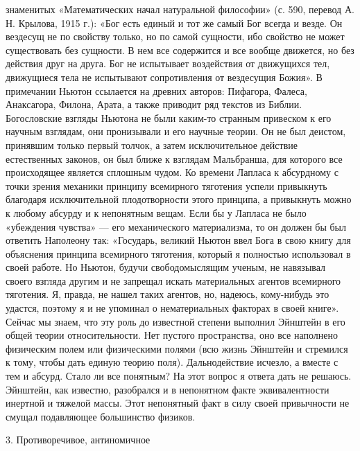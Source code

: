 знаменитых «Математических начал натуральной философии» (с. 590, перевод А. Н.
Крылова, 1915 г.): «Бог есть единый и тот же самый Бог всегда и везде. Он
вездесущ не по свойству только, но по самой сущности, ибо свойство не может
существовать без сущности. В нем все содержится и все вообще движется, но без
действия друг на друга. Бог не испытывает воздействия от движущихся тел,
движущиеся тела не испытывают сопротивления от вездесущия Божия». В примечании
Ньютон ссылается на древних авторов: Пифагора, Фалеса, Анаксагора, Филона,
Арата, а также приводит ряд текстов из Библии. Богословские взгляды Ньютона не
были каким-то странным привеском к его научным взглядам, они пронизывали и его
научные теории. Он не был деистом, принявшим только первый толчок, а затем
исключительное действие естественных законов, он был ближе к взглядам
Мальбранша, для которого все происходящее является сплошным чудом. Ко времени
Лапласа к абсурдному с точки зрения механики принципу всемирного тяготения
успели привыкнуть благодаря исключительной плодотворности этого принципа, а
привыкнуть можно к любому абсурду и к непонятным вещам. Если бы у Лапласа не
было «убеждения чувства» --- его механического материализма, то он должен бы
был ответить Наполеону так: «Государь, великий Ньютон ввел Бога в свою книгу
для объяснения принципа всемирного тяготения, который я полностью использовал в
своей работе. Но Ньютон, будучи свободомыслящим ученым, не навязывал своего
взгляда другим и не запрещал искать материальных агентов всемирного тяготения.
Я, правда, не нашел таких агентов, но, надеюсь, кому-нибудь это удастся,
поэтому я и не упоминал о нематериальных факторах в своей книге». Сейчас мы
знаем, что эту роль до известной степени выполнил Эйнштейн в его общей теории
относительности. Нет пустого пространства, оно все наполнено физическим полем
или физическими полями (всю жизнь Эйнштейн и стремился к тому, чтобы дать
единую теорию поля). Дальнодействие исчезло, а вместе с тем и абсурд. Стало ли
все понятным? На этот вопрос я ответа дать не решаюсь. Эйнштейн, как известно,
разобрался и в непонятном факте эквивалентности инертной и тяжелой массы. Этот
непонятный факт в силу своей привычности не смущал подавляющее большинство
физиков.

3. Противоречивое, антиномичное

